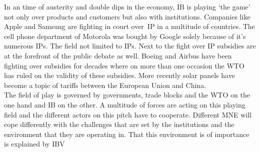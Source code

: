 In an time of austerity and double dips in the economy, \gls{IB} is playing `the game' not only over products and customers but also with institutions. 
Companies like Apple and Samsung are  fighting in court over~\gls{IP} in a multitude of countries. 
The cell phone department of Motorola was bought by Google solely because of it's numerous \glspl{IP}. The field not limited to \glspl{IP}. 
Next to the fight over \gls{IP} subsidies are at the forefront of the public debate as well. 
Boeing and Airbus have been fighting over subsidies for decades where on more than one occasion the \gls{WTO} has ruled on the validity of these subsidies. 
More recently solar panels have become a topic of tariffs between the European Union and China. \\

The field of play is governed by governments, trade blocks and the \gls{WTO} on the one hand and \gls{IB} on the other.
A multitude of forces are acting on this playing field and the different actors on this pitch have to cooperate. 
Different \gls{MNE} will cope differently with the challenges that are set by the institutions and the environment that they are operating in. That this environment is of importance is explained by \gls{IBV}~\cite{Kostova:1999,Meyer:2009,Wang:2012} 
